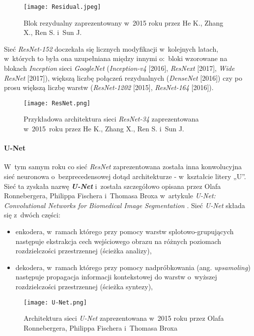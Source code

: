 \begin{figure}[!h]
    \centering \texttt{[image: Residual.jpeg]}
    \captionsetup{format=hang}
    \caption{Blok rezydualny zaprezentowany w~2015 roku przez He K., Zhang X., Ren S. i~Sun J. \cite{he}}
    \label{fig:residual1}
\end{figure}

Sieć \emph{ResNet-152} doczekała się licznych modyfikacji w~kolejnych latach, w~których to była ona uzupełniana między innymi o:~bloki wzorowane na blokach \emph{Inception} sieci \emph{GoogleNet} (\emph{Inception-v4} [2016], \emph{ResNext} [2017], \emph{Wide ResNet} [2017]), większą liczbę połączeń rezydualnych (\emph{DenseNet} [2016]) czy po prosu większą liczbę warstw (\emph{ResNet-1202} [2015], \emph{ResNet-164} [2016]).

\newpage
\begin{figure}[!h]
    \centering \texttt{[image: ResNet.png]}
    \captionsetup{format=hang}
    \caption{Przykładowa architektura sieci \emph{ResNet-34} zaprezentowana w~2015~roku przez He K., Zhang X., Ren S. i~Sun J. \cite{he}}
    \label{fig:resnet1}
\end{figure}
\newpage

\paragraph*{U-Net}

W~tym samym roku co sieć \emph{ResNet} zaprezentowana została inna konwolucyjna sieć neuronowa o~bezprecedensowej dotąd architekturze - w~kształcie litery „U”. Sieć ta zyskała nazwę \textbf{\emph{U-Net}} i~została szczegółowo opisana przez Olafa Ronnebergera, Philippa Fischera i~Thomasa Broxa w~artykule \emph{U-Net: Convolutional Networks for Biomedical Image Segmentation} \cite{ronneberger}. Sieć \emph{U-Net} składa się z~dwóch części:
\begin{itemize}
\item enkodera, w~ramach którego przy pomocy warstw splotowo-grupujących następuje ekstrakcja cech wejściowego obrazu na różnych poziomach rozdzielczości przestrzennej (ścieżka analizy),
\item dekodera, w~ramach którego przy pomocy nadpróbkowania (ang. \emph{upsamoling}) następuje propagacja informacji kontekstowej do warstw o~wyższej rozdzielczości przestrzennej (ścieżka syntezy),
\end{itemize}

\begin{figure}[!h]
    \centering \texttt{[image: U-Net.png]}
    \captionsetup{format=hang}
    \caption{Architektura sieci \emph{U-Net} zaprezentowana w~2015 roku przez Olafa Ronnebergera, Philippa Fischera i~Thomasa Broxa \cite{ronneberger}}
    \label{fig:unet1}
\end{figure}

